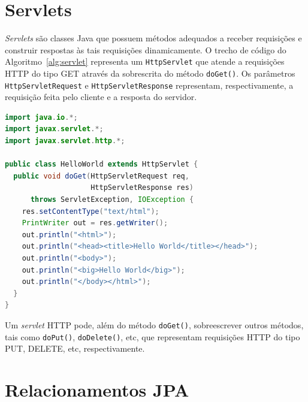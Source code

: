 \documentclass[
  10.5pt,				  %
	openright,			%
	twoside,			  %
  a5paper,
  chapter=TITLE,	%
	section=TITLE,	%
  hyphens,        %
	english,        %
	brazil          %
]{abntex2}
\begin{document}


%








\anexos

\chapter{Servlets}\label{anexo:servlets}

\emph{Servlets} são classes Java que possuem métodos adequados a receber requisições e construir respostas às tais requisições dinamicamente. O trecho de código do Algoritmo~\ref{alg:servlet} representa um \texttt{HttpServlet} que atende a requisições HTTP do tipo GET através da sobrescrita do método \texttt{doGet()}. Os parâmetros \texttt{HttpServletRequest} e \texttt{HttpServletResponse} representam, respectivamente, a requisição feita pelo cliente e a resposta do servidor.
%
\begin{lstlisting}[language=Java, caption={Um \emph{servlet} que imprime ``\emph{Hello World}''.}, label={alg:servlet}]
import java.io.*;
import javax.servlet.*;
import javax.servlet.http.*;

public class HelloWorld extends HttpServlet {
  public void doGet(HttpServletRequest req,
                    HttpServletResponse res)
      throws ServletException, IOException {
    res.setContentType("text/html");
    PrintWriter out = res.getWriter();
    out.println("<html>");
    out.println("<head><title>Hello World</title></head>");
    out.println("<body>");
    out.println("<big>Hello World</big>");
    out.println("</body></html>");
  }
}
\end{lstlisting}

Um \emph{servlet} HTTP pode, além do método \texttt{doGet()}, sobreescrever outros métodos, tais como \texttt{doPut()}, \texttt{doDelete()}, etc, que representam requisições HTTP do tipo PUT, DELETE, etc, respectivamente.



\chapter{Relacionamentos JPA}\label{anexo:jpa}
\end{document}
